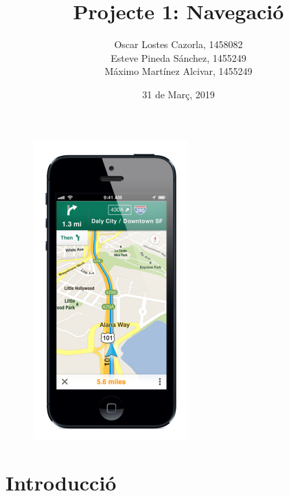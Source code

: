 \documentclass[a4paper,12pt,hidelinks]{article}
\begin{document}
    \title{\Large{\textbf{Projecte 1: Navegació}}}
    \author{Oscar Lostes Cazorla, 1458082\\
    Esteve Pineda Sánchez, 1455249\\
    Máximo Martínez Alcivar, 1455249}
    \date{31 de Març, 2019}

    \maketitle

    \begin{figure}[hb]    
        \centering  
        \includegraphics{portada.png}
    \end{figure}

    \thispagestyle{empty}

    \let\cleardoublepage\clearpage

    \pagebreak

    \setcounter{page}{1}

    \tableofcontents

    \pagestyle{fancy}
    \fancyhf{}
    \renewcommand{\headrulewidth}{2pt}
    \renewcommand{\footrulewidth}{1pt}

    \fancyfoot[C]{\thepage}

    \pagebreak

    \part{Introducció}
    \label{part:intro}
\end{document}

